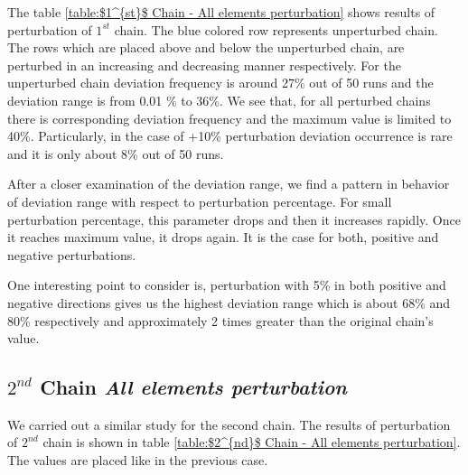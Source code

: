 \documentclass[10pts]{article}
\begin{document}
    \vspace*{4pt} 
     	The table \ref{table:$1^{st}$ Chain - All elements perturbation} shows results of perturbation of $1^{st}$ chain. The blue colored row represents unperturbed chain. The rows which are placed above and below the unperturbed chain, are  perturbed in an increasing and decreasing manner respectively. For the unperturbed chain deviation frequency is around 27\% out of 50 runs and the deviation range is from 0.01 \% to 36\%. We see that, for all perturbed chains there is corresponding  deviation frequency and the maximum value is limited to 40\%. Particularly, in the case of +10\% perturbation deviation occurrence is rare and it is only about  8\% out of 50 runs.
     	
     	After a closer examination of the deviation range, we find a pattern in behavior of deviation range with respect to perturbation percentage. For small perturbation percentage, this parameter drops and then it increases rapidly. Once it reaches maximum value, it drops again. It is the case for both, positive and negative perturbations.
     	
     	One interesting point to consider is, perturbation with 5\% in both positive and negative directions gives us the highest deviation range which is about 68\% and 80\% respectively and approximately 2 times greater than the original chain's value.



\subsection*{$2^{nd}$ Chain \hspace{10pt} \textit{All elements perturbation}}
        We carried out a similar study for the second chain. The results of perturbation of $2^{nd}$ chain is shown in table \ref{table:$2^{nd}$ Chain - All elements perturbation}. The values are placed like in the previous case.
        
\end{document}
